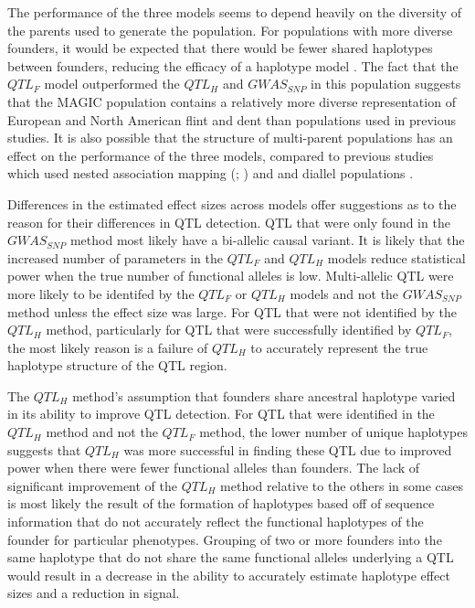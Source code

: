 \documentclass[article,9pt,twocolumn,twoside]{rilabRxiv}
\begin{document}
The performance of the three models seems to depend heavily on the diversity of the parents used to generate the population.
For populations with more diverse founders, it would be expected that there would be fewer shared haplotypes between founders, reducing the efficacy of a haplotype model \cite{Giraud}.
The fact that the $QTL_F$ model outperformed the $QTL_H$ and $GWAS_{SNP}$ in this population suggests that the MAGIC population contains a relatively more diverse representation of European and North American flint and dent than populations used in previous studies.
It is also possible that the structure of multi-parent populations has an effect on the performance of the three models, compared to previous studies which used nested association mapping (\cite{Giraud}; \cite{Garin2}) and and diallel populations \cite{Bardol}.

Differences in the estimated effect sizes across models offer suggestions as to the reason for their differences in QTL detection.
QTL that were only found in the $GWAS_{SNP}$ method most likely have a bi-allelic causal variant.
It is likely that the increased number of parameters in the $QTL_F$ and $QTL_H$ models reduce statistical power when the true number of functional alleles is low.
Multi-allelic QTL were more likely to be identifed by the $QTL_F$ or $QTL_H$ models and not the $GWAS_{SNP}$ method unless the effect size was large.
For QTL that were not identified by  the $QTL_H$ method, particularly for QTL that were successfully identified by $QTL_F$, the most likely reason is a failure of $QTL_H$ to accurately represent the true haplotype structure of the QTL region.

The $QTL_H$ method's assumption that founders share ancestral haplotype varied in its ability to improve QTL detection.
For QTL that were identified in the $QTL_H$ method and not the $QTL_F$ method, the lower number of unique haplotypes suggests that $QTL_H$ was more successful in finding these QTL due to improved power when there were fewer functional alleles than founders.
The lack of significant improvement of the $QTL_H$ method relative to the others in some cases is most likely the result of the formation of haplotypes based off of sequence information that do not accurately reflect the functional haplotypes of the founder for particular phenotypes.
Grouping of two or more founders into the same haplotype that do not share the same functional alleles underlying a QTL would result in a decrease in the ability to accurately estimate haplotype effect sizes and a reduction in signal.
\end{document}
